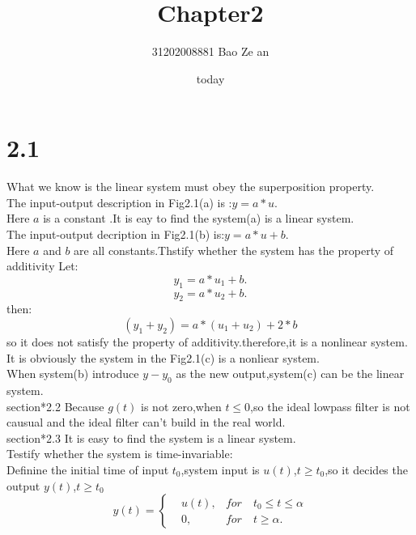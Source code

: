 \documentclass{article}
\title{Chapter2}
\author{31202008881        \quad \quad \quad
          Bao Ze an}
\date{today}
\begin{document}
\maketitle
\section*{2.1}
What we know is the linear system must obey the superposition property.\\
The input-output description in Fig2.1(a) is :$y=a*u$.\\
Here $a$ is a constant .It is eay to find the system(a) is a linear system.\\
The input-output decription in Fig2.1(b) is:$y=a*u+b$.\\
Here $a$ and $b$ are all constants.Thstify whether the system has the property of additivity
Let:
\[y_1=a*u_1+b.\]
\[y_2=a*u_2+b.\]
then:
\[(y_1+y_2)=a*(u_1+u_2)+2*b\]
so it does not satisfy the property of additivity.therefore,it is a nonlinear system.\\
It is obviously the system in the Fig2.1(c) is a nonliear system.\\
When system(b) introduce $y-y_0$ as the new output,system(c) can be the linear system.\\

section*{2.2}
Because $g(t)$ is not zero,when $t \leq 0$,so the ideal lowpass filter is not causual and the ideal filter 
can't build in the real world.\\

section*{2.3}
It is easy to find the system is a linear system.\\
Testify whether the system is time-invariable:\\
Definine the initial time of input $t_0$,system input is $u(t)$,$t \geq t_0$,so it decides the output $y(t)$,$t \geq t_0$ \\
\begin{equation}
y(t)=\left\{
\begin{aligned}
&u(t)  , &for \quad t_0 \leq t \leq \alpha \\
&0  , &for \quad t \geq \alpha.
\end{aligned}
\right.
\end{equation}
\end{document}
